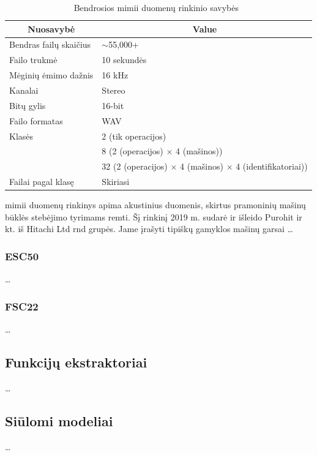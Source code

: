 \begin{table}[!ht]
	\centering
	\caption[Bendrosios MIMII duomenų rinkinio savybės]{Bendrosios \gls{mimii} duomenų rinkinio savybės~\cite{Purohit2019}}
	\label{tab:mimii_propertiesslt}
	\small
	\begin{tabular}{ll}
		\hline
		\multicolumn{1}{c}{\textbf{Nuosavybė}} & \multicolumn{1}{c}{\textbf{Value}} \\
		\hline
		Bendras failų skaičius & $\sim$55,000+ \\
		Failo trukmė & 10 sekundės \\
		Mėginių ėmimo dažnis & 16 kHz \\
		Kanalai & Stereo \\
		Bitų gylis & 16-bit \\
		Failo formatas & WAV \\
		Klasės & 2 (tik operacijos)\\
		& 8 (2 (operacijos) $\times$ 4 (mašinos))\\
		& 32 (2 (operacijos) $\times$ 4 (mašinos) $\times$ 4 (identifikatoriai))\\
		Failai pagal klasę & Skiriasi\\
		\hline
	\end{tabular}
\end{table}

\gls{mimii} duomenų rinkinys apima akustinius duomenis, skirtus pramoninių mašinų būklės stebėjimo tyrimams remti. Šį rinkinį 2019 m. sudarė ir išleido Purohit ir kt. iš Hitachi Ltd \gls{rnd} grupės. Jame įrašyti tipiškų gamyklos mašinų garsai \dots
\subsubsection*{ESC50}
\dots

\subsubsection*{FSC22}
\dots
\subsection*{Funkcijų ekstraktoriai}
\dots
\subsection*{Siūlomi modeliai}
\dots
